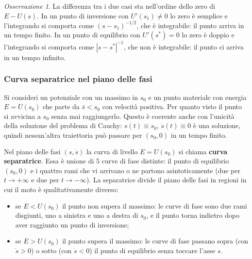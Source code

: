 \documentclass[11pt, a4paper, openright]{book}
\theoremstyle{plain}
\theoremstyle{definition}
\theoremstyle{remark}
\newtheorem{osservazione}[teorema]{Osservazione}
\begin{document}
    \begin{osservazione}
        La differenza tra i due casi sta nell'ordine dello zero di $E - U(s)$. In un punto di inversione con $U'(s_1) \neq 0$ lo zero è semplice e l'integrando si comporta come $(s - s_1)^{-1/2}$, che è integrabile: il punto arriva in un tempo finito. In un punto di equilibrio con $U'(s^*) = 0$ lo zero è doppio e l'integrando si comporta come $|s - s^*|^{-1}$, che non è integrabile: il punto ci arriva in un tempo infinito.
    \end{osservazione}


\subsubsection{Curva separatrice nel piano delle fasi}
    Si consideri un potenziale con un massimo in $s_0$ e un punto materiale con energia $E = U(s_0)$ che parte da $\bar{s} < s_0$ con velocità positiva. Per quanto visto il punto si avvicina a $s_0$ senza mai raggiungerlo. Questo è coerente anche con l'unicità della soluzione del problema di Cauchy: $s(t) \equiv s_0$, $\dot{s}(t) \equiv 0$ è una soluzione, quindi nessun'altra traiettoria può passare per $(s_0, 0)$ in un tempo finito.

    Nel piano delle fasi $(s, \dot{s})$ la curva di livello $E = U(s_0)$ si chiama \textbf{curva separatrice}. Essa è unione di $5$ curve di fase distinte: il punto di equilibrio $(s_0, 0)$ e i quattro rami che vi arrivano o ne partono asintoticamente (due per $t \to +\infty$ e due per $t \to -\infty$). La separatrice divide il piano delle fasi in regioni in cui il moto è qualitativamente diverso:
    \begin{itemize}
        \item se $E < U(s_0)$ il punto non supera il massimo: le curve di fase sono due rami disgiunti, uno a sinistra e uno a destra di $s_0$, e il punto torna indietro dopo aver raggiunto un punto di inversione;
        \item se $E > U(s_0)$ il punto supera il massimo: le curve di fase passano sopra (con $\dot{s} > 0$) o sotto (con $\dot{s} < 0$) il punto di equilibrio senza toccare l'asse $s$.
    \end{itemize}
\end{document}
